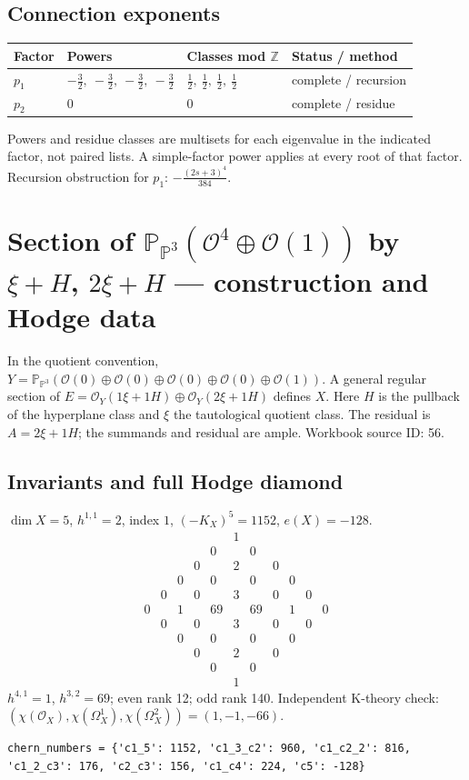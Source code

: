 \documentclass[10pt,a4paper]{article}
\begin{document}
\subsection*{Connection exponents}
\begin{center}\begin{tabular}{llll}\toprule Factor & Powers & Classes mod $\mathbb Z$ & Status / method\\\midrule
$p_{1}$ & $- \frac{3}{2},\ - \frac{3}{2},\ - \frac{3}{2},\ - \frac{3}{2}$ & $\frac{1}{2},\ \frac{1}{2},\ \frac{1}{2},\ \frac{1}{2}$ & complete / recursion\\
$p_{2}$ & $0$ & $0$ & complete / residue\\
\bottomrule\end{tabular}\end{center}
Powers and residue classes are multisets for each eigenvalue in the indicated factor, not paired lists. A simple-factor power applies at every root of that factor.
Recursion obstruction for $p_{1}$: $- \frac{\left(2 s + 3\right)^{4}}{384}$.
\clearpage\section*{Section of $\mathbb P_{\mathbb P^{3}}(\mathcal O^{4}\oplus \mathcal O(1))$ by $\xi +H$, $2\xi +H$ --- construction and Hodge data}\label{entry:PB5-056}
In the quotient convention, $Y=\mathbb P_{\mathbb P^{3}}(\mathcal O(0)\oplus\mathcal O(0)\oplus\mathcal O(0)\oplus\mathcal O(0)\oplus\mathcal O(1))$.
A general regular section of $E=\mathcal O_Y(1\xi+1H)\oplus\mathcal O_Y(2\xi+1H)$ defines $X$.
Here $H$ is the pullback of the hyperplane class and $\xi$ the tautological quotient class. The residual is $A=2\xi+1H$; the summands and residual are ample.
Workbook source ID: 56.
\subsection*{Invariants and full Hodge diamond}
$\dim X=5$, $h^{1,1}=2$, index $1$, $(-K_X)^5=1152$, $e(X)=-128$.
\[\begin{array}{ccccccccccc}&&&&&1&&&&&\\&&&&0&&0&&&&\\&&&0&&2&&0&&&\\&&0&&0&&0&&0&&\\&0&&0&&3&&0&&0&\\0&&1&&69&&69&&1&&0\\&0&&0&&3&&0&&0&\\&&0&&0&&0&&0&&\\&&&0&&2&&0&&&\\&&&&0&&0&&&&\\&&&&&1&&&&&\end{array}\]
$h^{4,1}=1$, $h^{3,2}=69$; even rank 12; odd rank 140.
Independent K-theory check: $(\chi(\mathcal O_X),\chi(\Omega_X^1),\chi(\Omega_X^2))=(1, -1, -66)$.
\begin{lstlisting}
chern_numbers = {'c1_5': 1152, 'c1_3_c2': 960, 'c1_c2_2': 816, 'c1_2_c3': 176, 'c2_c3': 156, 'c1_c4': 224, 'c5': -128}
\end{lstlisting}
\end{document}
